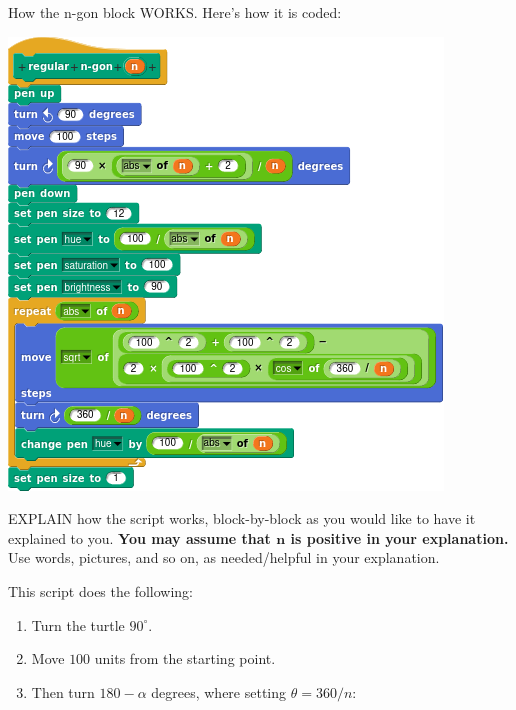 \documentclass[noauthor,nooutcomes,12pt,handout]{ximera}
\begin{document}
\begin{question}
  How the n-gon block WORKS.  Here's how it is coded:
  \begin{center}
    \includegraphics{regNGonBlockScript.png}
  \end{center}
  EXPLAIN how the script works, block-by-block as you would like to
  have it explained to you. \textbf{You may assume that $\boldsymbol n$ is positive in
  your explanation.} Use words, pictures, and so on, as needed/helpful
  in your explanation.
  \begin{freeResponse}
    This script does the following:
    \begin{enumerate}
    \item Turn the turtle $90^\circ$.
    \item Move $100$ units from the starting point.
    \item Then turn $180-\alpha$ degrees, where setting $\theta=
      360/n$:
      \begin{center}
\end{center}
\end{enumerate}
\end{freeResponse}
\end{question}
\end{document}
